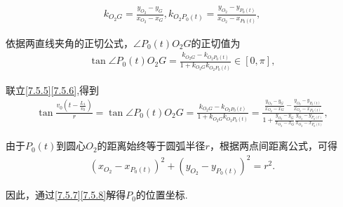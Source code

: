 \documentclass{cumcmthesis}
\begin{document}
        \begin{align}
            k_{O_2G}=\frac{y_{O_2}-y_G}{x_{O_2}-x_G},k_{O_2P_0\left( t \right)}=\frac{y_{O_2}-y_{P_0\left( t \right)}}{x_{O_2}-x_{P_0\left( t \right)}},\label{7.5.6}
        \end{align}
        \par 依据两直线夹角的正切公式，\(\angle P_{0}(t)O_{2}G\)的正切值为
\begin{align}
    \tan \angle P_0\left( t \right) O_2G=\frac{k_{O_2G}-k_{O_2P_0\left( t \right)}}{1+k_{O_2G}k_{O_2P_0\left( t \right)}}\in \left[ 0,\pi \right] ,\label{7.5.6}
\end{align}
\par 联立\eqref{7.5.5}\eqref{7.5.6},得到
        \begin{align}
            \tan \frac{v_0\left( t-\frac{L_1}{v_0} \right)}{r}=\tan \angle P_0\left( t \right) O_2G=\frac{k_{O_2G}-k_{O_2P_0\left( t \right)}}{1+k_{O_2G}k_{O_2P_0\left( t \right)}}=\frac{\frac{y_{O_2}-y_G}{x_{O_2}-x_G}-\frac{y_{O_2}-y_{P_0\left( t \right)}}{x_{O_2}-x_{P_0\left( t \right)}}}{1+\frac{y_{O_2}-y_G}{x_{O_2}-x_G}\frac{y_{O_2}-y_{P_0\left( t \right)}}{x_{O_2}-x_{P_0\left( t \right)}}},\label{7.5.7}
        \end{align}
\par 由于$P_{0}(t)$到圆心$O_{2}$的距离始终等于圆弧半径\(r\)，根据两点间距离公式，可得
\begin{align}
    \left( x_{O_2}-x_{P_0\left( t \right)} \right) ^2+\left( y_{O_2}-y_{P_0\left( t \right)} \right) ^2=r^2.\label{7.5.8}
\end{align} 

\par 因此，通过\eqref{7.5.7}\eqref{7.5.8}解得$P_0$的位置坐标.  
\end{document}
